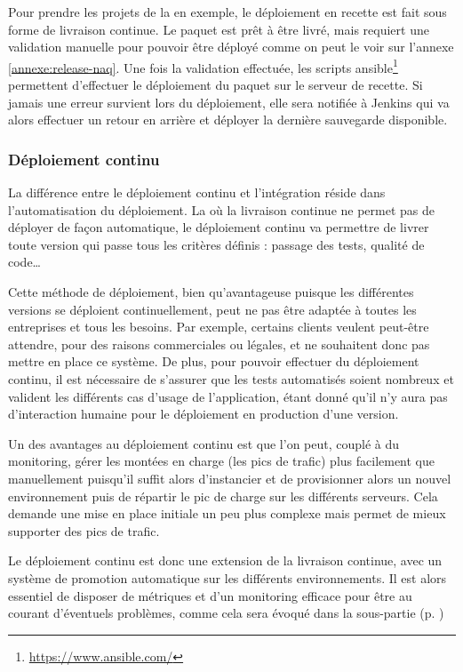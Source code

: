 Pour prendre les projets de la \naq{} en exemple, le déploiement en recette est fait sous forme de livraison continue. Le paquet est prêt à être livré, mais requiert une validation manuelle pour pouvoir être déployé comme on peut le voir sur l'annexe \ref{annexe:release-naq}. Une fois la validation effectuée, les scripts ansible\footnote{\url{https://www.ansible.com/}} permettent d'effectuer le déploiement du paquet sur le serveur de recette. Si jamais une erreur survient lors du déploiement, elle sera notifiée à Jenkins qui va alors effectuer un retour en arrière et déployer la dernière sauvegarde disponible.

\subsubsection{Déploiement continu}

La différence entre le déploiement continu et l'intégration réside dans l'automatisation du déploiement. La où la livraison continue ne permet pas de déployer de façon automatique, le déploiement continu va permettre de livrer toute version qui passe tous les critères définis : passage des tests, qualité de code\ldots

Cette méthode de déploiement, bien qu'avantageuse puisque les différentes versions se déploient continuellement, peut ne pas être adaptée à toutes les entreprises et tous les besoins. Par exemple, certains clients veulent peut-être attendre, pour des raisons commerciales ou légales, et ne souhaitent donc pas mettre en place ce système. De plus, pour pouvoir effectuer du déploiement continu, il est nécessaire de s'assurer que les tests automatisés soient nombreux et valident les différents cas d'usage de l'application, étant donné qu'il n'y aura pas d'interaction humaine pour le déploiement en production d'une version.

Un des avantages au déploiement continu est que l'on peut, couplé à du monitoring, gérer les montées en charge (les pics de trafic) plus facilement que manuellement puisqu'il suffit alors d'instancier et de provisionner alors un nouvel environnement puis de répartir le pic de charge sur les différents serveurs. Cela demande une mise en place initiale un peu plus complexe mais permet de mieux supporter des pics de trafic.

Le déploiement continu est donc une extension de la livraison continue, avec un système de promotion automatique sur les différents environnements. Il est alors essentiel de disposer de métriques et d'un monitoring efficace pour être au courant d'éventuels problèmes, comme cela sera évoqué dans la sous-partie  (p. \pageref{paragraph:monitoring})

